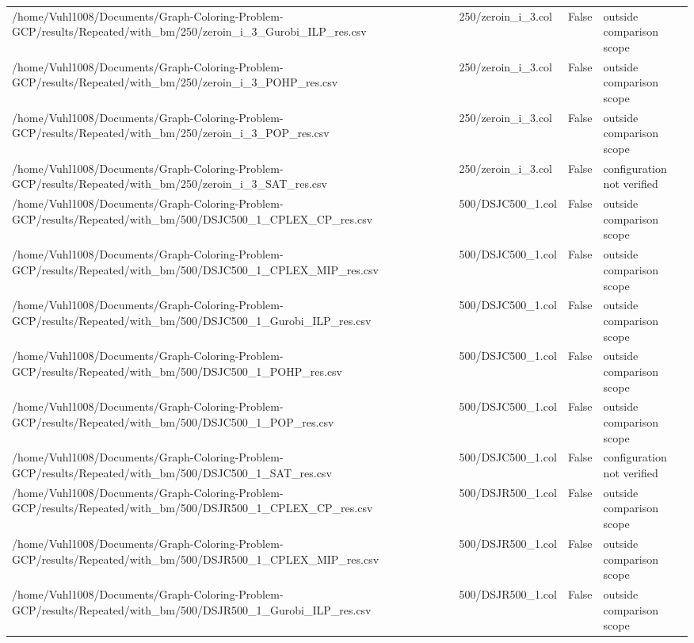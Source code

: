 \begin{table}[htbp]
\begin{tabular}{llll}
/home/Vuhl1008/Documents/Graph-Coloring-Problem-GCP/results/Repeated/with\_bm/250/zeroin\_i\_3\_Gurobi\_ILP\_res.csv & 250/zeroin\_i\_3.col & False & outside comparison scope \\
/home/Vuhl1008/Documents/Graph-Coloring-Problem-GCP/results/Repeated/with\_bm/250/zeroin\_i\_3\_POHP\_res.csv & 250/zeroin\_i\_3.col & False & outside comparison scope \\
/home/Vuhl1008/Documents/Graph-Coloring-Problem-GCP/results/Repeated/with\_bm/250/zeroin\_i\_3\_POP\_res.csv & 250/zeroin\_i\_3.col & False & outside comparison scope \\
/home/Vuhl1008/Documents/Graph-Coloring-Problem-GCP/results/Repeated/with\_bm/250/zeroin\_i\_3\_SAT\_res.csv & 250/zeroin\_i\_3.col & False & configuration not verified \\
/home/Vuhl1008/Documents/Graph-Coloring-Problem-GCP/results/Repeated/with\_bm/500/DSJC500\_1\_CPLEX\_CP\_res.csv & 500/DSJC500\_1.col & False & outside comparison scope \\
/home/Vuhl1008/Documents/Graph-Coloring-Problem-GCP/results/Repeated/with\_bm/500/DSJC500\_1\_CPLEX\_MIP\_res.csv & 500/DSJC500\_1.col & False & outside comparison scope \\
/home/Vuhl1008/Documents/Graph-Coloring-Problem-GCP/results/Repeated/with\_bm/500/DSJC500\_1\_Gurobi\_ILP\_res.csv & 500/DSJC500\_1.col & False & outside comparison scope \\
/home/Vuhl1008/Documents/Graph-Coloring-Problem-GCP/results/Repeated/with\_bm/500/DSJC500\_1\_POHP\_res.csv & 500/DSJC500\_1.col & False & outside comparison scope \\
/home/Vuhl1008/Documents/Graph-Coloring-Problem-GCP/results/Repeated/with\_bm/500/DSJC500\_1\_POP\_res.csv & 500/DSJC500\_1.col & False & outside comparison scope \\
/home/Vuhl1008/Documents/Graph-Coloring-Problem-GCP/results/Repeated/with\_bm/500/DSJC500\_1\_SAT\_res.csv & 500/DSJC500\_1.col & False & configuration not verified \\
/home/Vuhl1008/Documents/Graph-Coloring-Problem-GCP/results/Repeated/with\_bm/500/DSJR500\_1\_CPLEX\_CP\_res.csv & 500/DSJR500\_1.col & False & outside comparison scope \\
/home/Vuhl1008/Documents/Graph-Coloring-Problem-GCP/results/Repeated/with\_bm/500/DSJR500\_1\_CPLEX\_MIP\_res.csv & 500/DSJR500\_1.col & False & outside comparison scope \\
/home/Vuhl1008/Documents/Graph-Coloring-Problem-GCP/results/Repeated/with\_bm/500/DSJR500\_1\_Gurobi\_ILP\_res.csv & 500/DSJR500\_1.col & False & outside comparison scope \\

\end{tabular}
\end{table}
